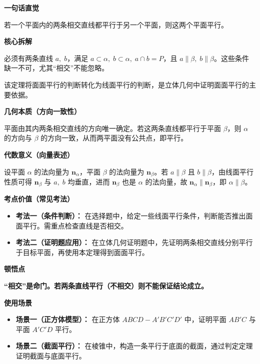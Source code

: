 \begin{explanationbox}
	\textbf{\textcolor{CExplanation}{一句话直觉}}

	若一个平面内的两条相交直线都平行于另一个平面，则这两个平面平行。

	\medskip
	\textbf{\textcolor{CExplanation}{核心拆解}}
	\begin{description}[style=nextline, leftmargin=2.8em, labelsep=0.5em, itemsep=0.45em]
		\item[\textbf{要点一（相交直线条件）：}] 必须有两条直线 $a,\;b$，满足 $a\subset\alpha,\;b\subset\alpha,\;a\cap b=P$，且 $a\parallel\beta,\;b\parallel\beta$。这些条件缺一不可，尤其“相交”不能忽略。
		\item[\textbf{要点二（线面推面面）：}] 该定理将面面平行的判断转化为线面平行的判断，是立体几何中证明面面平行的主要依据。
	\end{description}

	\medskip
	\textbf{\textcolor{CExplanation}{几何本质（方向一致性）}}

	平面由其内两条相交直线的方向唯一确定。若这两条直线都平行于平面 $\beta$，则 $\alpha$ 的方向与 $\beta$ 的方向一致，从而两平面没有公共点，即平行。

	\medskip
	\textbf{\textcolor{CExplanation}{代数意义（向量表述）}}

	设平面 $\alpha$ 的法向量为 $\mathbf{n}_\alpha$，平面 $\beta$ 的法向量为 $\mathbf{n}_\beta$。若 $a\parallel\beta$ 且 $b\parallel\beta$，由线面平行性质可得 $\mathbf{n}_\beta$ 与 $a,\;b$ 均垂直，进而 $\mathbf{n}_\beta$ 也是 $\alpha$ 的法向量，故 $\mathbf{n}_\alpha\parallel\mathbf{n}_\beta$，即 $\alpha\parallel\beta$。

	\medskip
	\textbf{\textcolor{CExplanation}{考点价值（常见考法）}}
	\begin{itemize}[leftmargin=*, itemsep=0.5em, topsep=0.4em]
		\item \textbf{考法一（条件判断）：} 在选择题中，给定一些线面平行条件，判断能否推出面面平行。需重点检查直线是否相交。
		\item \textbf{考法二（证明题应用）：} 在立体几何证明题中，先证明两条相交直线分别平行于目标平面，再使用本定理得到面面平行。
	\end{itemize}

	\medskip
	\textbf{\textcolor{CExplanation}{顿悟点}}

	\textbf{“相交”是命门。若两条直线平行（不相交）则不能保证结论成立。}

	\medskip
	\textbf{\textcolor{CExplanation}{使用场景}}
	\begin{itemize}[leftmargin=*, itemsep=0.5em, topsep=0.4em]
		\item \textbf{场景一（正方体模型）：} 在正方体 $ABCD-A'B'C'D'$ 中，证明平面 $AB'C$ 与平面 $A'C'D$ 平行。
		\item \textbf{场景二（截面平行）：} 在棱锥中，构造一条平行于底面的截面，通过判定定理证明截面与底面平行。
	\end{itemize}
\end{explanationbox}
